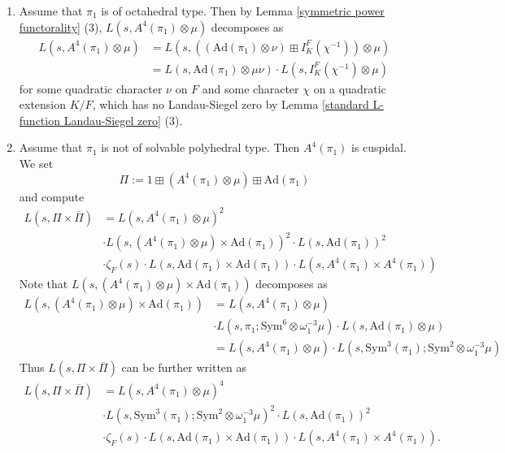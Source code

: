 \documentclass[12pt]{amsart}
\newcommand{\Ad}{\text{Ad}}
\newcommand{\Sym}{\text{Sym}}
\newcommand{\ov}{\overline}
\begin{document}
\begin{enumerate}
\begin{enumerate}
\begin{enumerate}
            \item Assume that $\pi_1$ is of octahedral type. Then by Lemma \ref{symmetric power functorality} (3), $L(s,A^4(\pi_1) \otimes \mu)$ decomposes as 
            \begin{align*}
                L(s,A^4(\pi_1) \otimes \mu) &= L(s,((\Ad(\pi_1) \otimes \nu) \boxplus I_K^F(\chi^{-1})) \otimes \mu) \\
                &= L(s,\Ad(\pi_1) \otimes \mu\nu) \cdot L(s,I_K^F(\chi^{-1}) \otimes \mu)
            \end{align*}
            for some quadratic character $\nu$ on $F$ and some character $\chi$ on a quadratic extension $K/F$, which has no Landau-Siegel zero by Lemma \ref{standard L-function Landau-Siegel zero} (3).
            \item Assume that $\pi_1$ is not of solvable polyhedral type. Then $A^4(\pi_1)$ is cuspidal. We set 
            $$\Pi := 1 \boxplus (A^4(\pi_1) \otimes \mu) \boxplus \Ad(\pi_1)$$
            and compute 
            \begin{align*}
                L(s,\Pi \times \ov{\Pi}) &= L(s,A^4(\pi_1) \otimes \mu)^2 \\
                &\cdot L(s,(A^4(\pi_1) \otimes \mu)\times \Ad(\pi_1))^2 \cdot L(s,\Ad(\pi_1))^2 \\
                &\cdot \zeta_F(s) \cdot L(s,\Ad(\pi_1) \times \Ad(\pi_1)) \cdot L(s,A^4(\pi_1) \times A^4(\pi_1))
            \end{align*}
            Note that $L(s,(A^4(\pi_1) \otimes \mu)\times \Ad(\pi_1))$ decomposes as 
            \begin{align*}
                L(s,(A^4(\pi_1) \otimes \mu)\times \Ad(\pi_1)) &= L(s,A^4(\pi_1) \otimes \mu) \\
                &\cdot L(s,\pi_1;\Sym^6 \otimes \omega_1^{-3}\mu) \cdot L(s,\Ad(\pi_1) \otimes \mu) \\
                &=L(s,A^4(\pi_1) \otimes \mu) \cdot L(s,\Sym^3(\pi_1);\Sym^2\otimes \omega_1^{-3}\mu)
            \end{align*}
            Thus $L(s,\Pi \times \ov{\Pi})$ can be further written as 
            \begin{align*}
                L(s,\Pi \times \ov{\Pi}) &= L(s,A^4(\pi_1) \otimes \mu)^4 \\
                &\cdot L(s,\Sym^3(\pi_1);\Sym^2\otimes \omega_1^{-3}\mu)^2 \cdot L(s,\Ad(\pi_1))^2 \\
                &\cdot \zeta_F(s) \cdot L(s,\Ad(\pi_1) \times \Ad(\pi_1)) \cdot L(s,A^4(\pi_1) \times A^4(\pi_1)).

\end{align*}
\end{enumerate}
\end{enumerate}
\end{enumerate}
\end{document}
